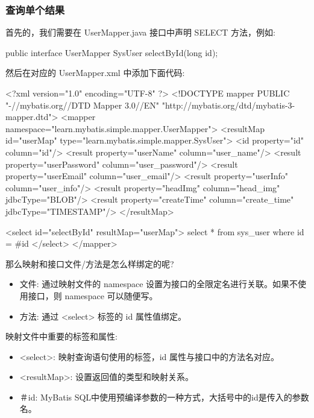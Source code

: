 \subsubsection{查询单个结果}

首先的，我们需要在 UserMapper.java 接口中声明 SELECT 方法，例如:
\begin{Java}
public interface UserMapper {
    SysUser selectById(long id);
}
\end{Java}

然后在对应的 UserMapper.xml 中添加下面代码:

\begin{xml}
<?xml version="1.0" encoding="UTF-8" ?>
<!DOCTYPE mapper PUBLIC "-//mybatis.org//DTD Mapper 3.0//EN"
        "http://mybatis.org/dtd/mybatis-3-mapper.dtd">
<mapper namespace="learn.mybatis.simple.mapper.UserMapper">
    <resultMap id="userMap" type="learn.mybatis.simple.mapper.SysUser">
        <id property="id" column="id"/>
        <result property="userName" column="user_name"/>
        <result property="userPassword" column="user_password"/>
        <result property="userEmail" column="user_email"/>
        <result property="userInfo" column="user_info"/>
        <result property="headImg" column="head_img" jdbcType="BLOB"/>
        <result property="createTime" column="create_time" jdbcType="TIMESTAMP"/>
    </resultMap>
    
    <select id="selectById" resultMap="userMap">
        select * from sys_user where id = #{id}
    </select>
</mapper>
\end{xml}

那么映射和接口文件/方法是怎么样绑定的呢?
\begin{itemize}
    \item 文件: 通过映射文件的 namespace 设置为接口的全限定名进行关联。如果不使用接口，则 namespace 可以随便写。
    \item 方法: 通过 <select> 标签的 id 属性值绑定。
\end{itemize}

映射文件中重要的标签和属性:
\begin{itemize}
    \item <select>: 映射查询语句使用的标签，id 属性与接口中的方法名对应。
    \item <resultMap>: 设置返回值的类型和映射关系。
    \item ＃{id}: MyBatis SQL中使用预编译参数的一种方式，大括号中的id是传入的参数名。
\end{itemize}

